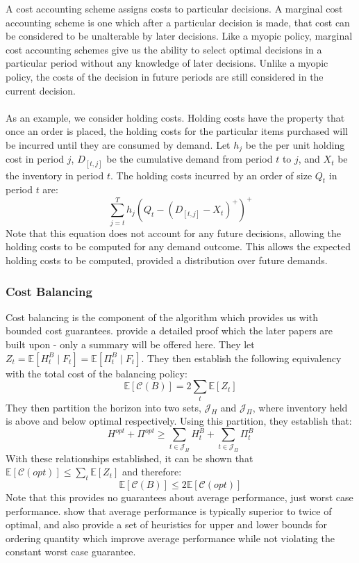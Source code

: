 \documentclass[12pt]{article}
\newcommand{\EX}{\mathbb{E}}
\begin{document}
A cost accounting scheme assigns costs to particular decisions. A marginal cost accounting scheme is one which after a particular decision is made, that cost can be considered to be unalterable by later decisions. Like a myopic policy, marginal cost accounting schemes give us the ability to select optimal decisions in a particular period without any knowledge of later decisions. Unlike a myopic policy, the costs of the decision in future periods are still considered in the current decision. \\
\\
As an example, we consider holding costs. Holding costs have the property that once an order is placed, the holding costs for the particular items purchased will be incurred until they are consumed by demand. Let $h_j$ be the per unit holding cost in period $j$, $D_{[t,j]}$ be the cumulative demand from period $t$ to $j$, and $X_t$ be the inventory in period $t$. The holding costs incurred by an order of size $Q_t$ in period $t$ are:
$$
	\sum_{j=t}^T h_j (Q_t - (D_{[t,j]} - X_t)^+)^+
$$
Note that this equation does not account for any future decisions, allowing the holding costs to be computed for any demand outcome. This allows the expected holding costs to be computed, provided a distribution over future demands.

\subsubsection{Cost Balancing}

Cost balancing is the component of the algorithm which provides us with bounded cost guarantees. \cite{levi:2007} provide a detailed proof which the later papers are built upon - only a summary will be offered here. They let $Z_t = \EX[H_t^B \; | \; F_t] = \EX[\Pi_t^B \; | \; F_t]$. They then establish the following equivalency with the total cost of the balancing policy:
$$
	\EX[\mathcal{C}(B)] = 2 \sum_t \EX[Z_t]
$$ 
They then partition the horizon into two sets, $\mathcal{J}_H$ and $\mathcal{J}_{\Pi}$, where inventory held is above and below optimal respectively. Using this partition, they establish that:
$$
	H^{opt} + \Pi^{opt} \geq \sum_{t \in \mathcal{J}_H} H_t^B + \sum_{t \in \mathcal{J}_{\Pi}} \Pi_t^B
$$
With these relationships established, it can be shown that $\EX[\mathcal{C}(opt)] \leq \sum_t \EX[Z_t]$ and therefore:
$$
	\EX[\mathcal{C}(B)] \leq 2 \EX[\mathcal{C}(opt)]
$$
Note that this provides no guarantees about average performance, just worst case performance. \cite{hurley:2007} show that average performance is typically superior to twice of optimal, and also provide a set of heuristics for upper and lower bounds for ordering quantity which improve average performance while not violating the constant worst case guarantee. 
\end{document}
